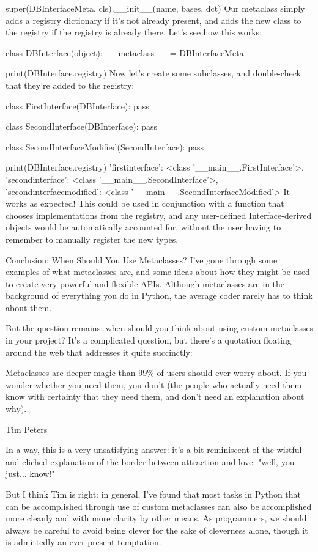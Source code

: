         super(DBInterfaceMeta, cls).__init__(name, bases, dct)
Our metaclass simply adds a registry dictionary if it's not already present, and adds the new class to the registry if the registry is already there. Let's see how this works:

class DBInterface(object):
    __metaclass__ = DBInterfaceMeta

print(DBInterface.registry)
{}
Now let's create some subclasses, and double-check that they're added to the registry:

class FirstInterface(DBInterface):
    pass

class SecondInterface(DBInterface):
    pass

class SecondInterfaceModified(SecondInterface):
    pass

print(DBInterface.registry)
{'firstinterface': <class '__main__.FirstInterface'>, 'secondinterface': <class '__main__.SecondInterface'>, 'secondinterfacemodified': <class '__main__.SecondInterfaceModified'>}
It works as expected! This could be used in conjunction with a function that chooses implementations from the registry, and any user-defined Interface-derived objects would be automatically accounted for, without the user having to remember to manually register the new types.

Conclusion: When Should You Use Metaclasses?
I've gone through some examples of what metaclasses are, and some ideas about how they might be used to create very powerful and flexible APIs. Although metaclasses are in the background of everything you do in Python, the average coder rarely has to think about them.

But the question remains: when should you think about using custom metaclasses in your project? It's a complicated question, but there's a quotation floating around the web that addresses it quite succinctly:

Metaclasses are deeper magic than 99\% of users should ever worry about. If you wonder whether you need them, you don't (the people who actually need them know with certainty that they need them, and don't need an explanation about why).

Tim Peters

In a way, this is a very unsatisfying answer: it's a bit reminiscent of the wistful and cliched explanation of the border between attraction and love: "well, you just... know!"

But I think Tim is right: in general, I've found that most tasks in Python that can be accomplished through use of custom metaclasses can also be accomplished more cleanly and with more clarity by other means. As programmers, we should always be careful to avoid being clever for the sake of cleverness alone, though it is admittedly an ever-present temptation.

